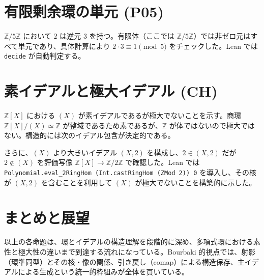 \documentclass[uplatex,12pt]{ltjsarticle}
\theoremstyle{definition}
\theoremstyle{remark}
\begin{document}
\section{有限剰余環の単元 (P05)}
$\mathbb{Z}/5\mathbb{Z}$ において $2$ は逆元 $3$ を持つ。有限体（ここでは $\mathbb{Z}/5\mathbb{Z}$）では非ゼロ元はすべて単元であり、具体計算により $2 \cdot 3 \equiv 1 \pmod{5}$ をチェックした。Lean では \texttt{decide} が自動判定する。

\section{素イデアルと極大イデアル (CH)}
$\mathbb{Z}[X]$ における $(X)$ が素イデアルであるが極大でないことを示す。商環 $\mathbb{Z}[X]/(X) \simeq \mathbb{Z}$ が整域であるため素であるが、$\mathbb{Z}$ が体ではないので極大ではない。構造的には次のイデアル包含が決定的である。


さらに、$(X)$ より大きいイデアル $(X,2)$ を構成し、$2 \in (X,2)$ だが $2 \notin (X)$ を評価写像 $\mathbb{Z}[X] \to \mathbb{Z}/2\mathbb{Z}$ で確認した。Lean では \texttt{Polynomial.eval\_2RingHom (Int.castRingHom (ZMod 2)) 0} を導入し、その核が $(X,2)$ を含むことを利用して $(X)$ が極大でないことを構築的に示した。

\section{まとめと展望}
以上の各命題は、環とイデアルの構造理解を段階的に深め、多項式環における素性と極大性の違いまで到達する流れになっている。Bourbaki 的視点では、射影（環準同型）とその核・像の関係、引き戻し（comap）による構造保存、主イデアルによる生成という統一的枠組みが全体を貫いている。
\end{document}
